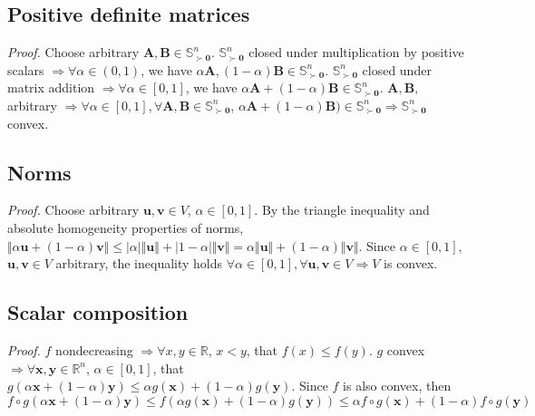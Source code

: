 \documentclass{article}
\numberwithin{equation}{section}
\begin{document}
\subsection{Positive definite matrices}

\textit{Proof.} Choose arbitrary $ \mathbf{A}, \mathbf{B} \in
\mathbb{S}^n_{\succ \mathbf{0}} $. $ \mathbb{S}^n_{\succ \mathbf{0}} $ closed
under multiplication by positive scalars $ \Rightarrow \forall \alpha
\in (0, 1) $, we have $ \alpha\mathbf{A}, (1 - \alpha)\mathbf{B} \in
\mathbb{S}^n_{\succ \mathbf{0}} $. $ \mathbb{S}^n_{\succ \mathbf{0}} $ closed
under matrix addition $ \Rightarrow \forall \alpha \in [0, 1] $, we have
$ \alpha\mathbf{A} + (1 - \alpha)\mathbf{B} \in
\mathbb{S}^n_{\succ \mathbf{0}} $. $ \mathbf{A}, \mathbf{B}, $ arbitrary
$ \Rightarrow \forall \alpha \in [0, 1], \forall \mathbf{A}, \mathbf{B} \in
\mathbb{S}^n_{\succ \mathbf{0}} $, $ \alpha\mathbf{A} +
(1 - \alpha)\mathbf{B}) \in \mathbb{S}^n_{\succ \mathbf{0}} \Rightarrow
\mathbb{S}^n_{\succ \mathbf{0}} $ convex.

\subsection{Norms}

\textit{Proof.} Choose arbitrary $ \mathbf{u}, \mathbf{v} \in V $, $ \alpha \in
[0, 1] $. By the triangle inequality and absolute homogeneity properties of
norms, $ \Vert\alpha\mathbf{u} + (1 - \alpha)\mathbf{v}\Vert \le
|\alpha|\Vert\mathbf{u}\Vert + |1 - \alpha|\Vert\mathbf{v}\Vert =
\alpha\Vert\mathbf{u}\Vert + (1 - \alpha)\Vert\mathbf{v}\Vert $. Since
$ \alpha \in [0, 1] $, $ \mathbf{u}, \mathbf{v} \in V $ arbitrary, the
inequality holds $ \forall \alpha \in [0, 1], \forall \mathbf{u}, \mathbf{v}
\in V \Rightarrow V $ is convex.


\subsection{Scalar composition}

\textit{Proof.} $ f $ nondecreasing $ \Rightarrow \forall x, y \in
\mathbb{R} $, $ x < y $, that $ f(x) \le f(y) $. $ g $ convex $ \Rightarrow
\forall \mathbf{x}, \mathbf{y} \in \mathbb{R}^n $, $ \alpha \in [0, 1] $,
that $ g(\alpha\mathbf{x} + (1 - \alpha)\mathbf{y}) \le
\alpha g(\mathbf{x}) + (1 - \alpha)g(\mathbf{y}) $. Since $ f $ is also
convex, then
\begin{equation*}
    f \circ g(\alpha\mathbf{x} + (1 - \alpha)\mathbf{y}) \le
    f(\alpha g(\mathbf{x}) + (1 - \alpha)g(\mathbf{y})) \le
    \alpha f \circ g(\mathbf{x}) + (1 - \alpha)f \circ g(\mathbf{y})
\end{equation*}
\end{document}

